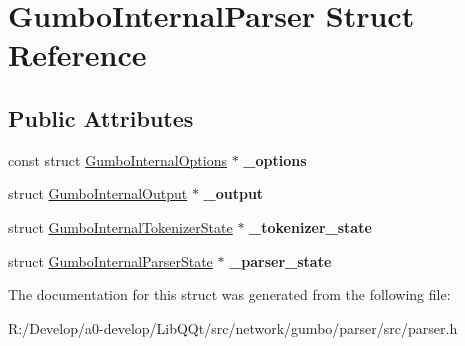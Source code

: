 \hypertarget{struct_gumbo_internal_parser}{}\section{Gumbo\+Internal\+Parser Struct Reference}
\label{struct_gumbo_internal_parser}
\subsection*{Public Attributes}
\begin{DoxyCompactItemize}
\item 
\mbox{\label{struct_gumbo_internal_parser_a2d2e0d83a0ef683f1e4a4ed5238cda4d}} 
const struct \mbox{\hyperlink{struct_gumbo_internal_options}{Gumbo\+Internal\+Options}} $\ast$ {\bfseries \+\_\+options}
\item 
\mbox{\label{struct_gumbo_internal_parser_a3dc2028b6ecaccef109ce2a79d8b9622}} 
struct \mbox{\hyperlink{struct_gumbo_internal_output}{Gumbo\+Internal\+Output}} $\ast$ {\bfseries \+\_\+output}
\item 
\mbox{\label{struct_gumbo_internal_parser_a1c3f2c974d86d7ae6a6536b33b5bb2ef}} 
struct \mbox{\hyperlink{struct_gumbo_internal_tokenizer_state}{Gumbo\+Internal\+Tokenizer\+State}} $\ast$ {\bfseries \+\_\+tokenizer\+\_\+state}
\item 
\mbox{\label{struct_gumbo_internal_parser_aaa4959caadf393c9da12f9d036708dc2}} 
struct \mbox{\hyperlink{struct_gumbo_internal_parser_state}{Gumbo\+Internal\+Parser\+State}} $\ast$ {\bfseries \+\_\+parser\+\_\+state}
\end{DoxyCompactItemize}


The documentation for this struct was generated from the following file\+:\begin{DoxyCompactItemize}
\item 
R\+:/\+Develop/a0-\/develop/\+Lib\+Q\+Qt/src/network/gumbo/parser/src/parser.\+h\end{DoxyCompactItemize}
